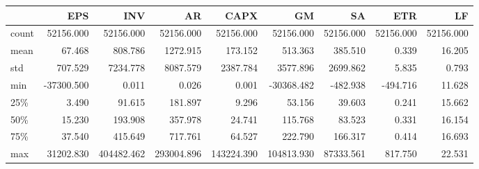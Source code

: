 \begin{tabular}{lrrrrrrrr}
\toprule
{} &        EPS &         INV &          AR &        CAPX &          GM &         SA &        ETR &         LF \\
\midrule
count &  52156.000 &   52156.000 &   52156.000 &   52156.000 &   52156.000 &  52156.000 &  52156.000 &  52156.000 \\
mean  &     67.468 &     808.786 &    1272.915 &     173.152 &     513.363 &    385.510 &      0.339 &     16.205 \\
std   &    707.529 &    7234.778 &    8087.579 &    2387.784 &    3577.896 &   2699.862 &      5.835 &      0.793 \\
min   & -37300.500 &       0.011 &       0.026 &       0.001 &  -30368.482 &   -482.938 &   -494.716 &     11.628 \\
25\%   &      3.490 &      91.615 &     181.897 &       9.296 &      53.156 &     39.603 &      0.241 &     15.662 \\
50\%   &     15.230 &     193.908 &     357.978 &      24.741 &     115.768 &     83.523 &      0.331 &     16.154 \\
75\%   &     37.540 &     415.649 &     717.761 &      64.527 &     222.790 &    166.317 &      0.414 &     16.693 \\
max   &  31202.830 &  404482.462 &  293004.896 &  143224.390 &  104813.930 &  87333.561 &    817.750 &     22.531 \\
\bottomrule
\end{tabular}
